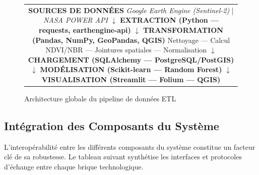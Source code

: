\documentclass[12pt,a4paper]{report}
\begin{document}
\begin{figure}[H]
\centering
\begin{tabular}{c}
\fbox{\parbox{0.82\textwidth}{
\centering
\vspace{0.4cm}
{\small\textbf{SOURCES DE DONNÉES}}\\[0.2cm]
\textit{Google Earth Engine (Sentinel-2)} \quad | \quad \textit{NASA POWER API}\\[0.3cm]
$\downarrow$\\[0.2cm]
{\small\textbf{EXTRACTION (Python --- requests, earthengine-api)}}\\[0.3cm]
$\downarrow$\\[0.2cm]
{\small\textbf{TRANSFORMATION (Pandas, NumPy, GeoPandas, QGIS)}}\\
{\scriptsize Nettoyage --- Calcul NDVI/NBR --- Jointures spatiales --- Normalisation}\\[0.3cm]
$\downarrow$\\[0.2cm]
{\small\textbf{CHARGEMENT (SQLAlchemy --- PostgreSQL/PostGIS)}}\\[0.3cm]
$\downarrow$\\[0.2cm]
{\small\textbf{MODÉLISATION (Scikit-learn --- Random Forest)}}\\[0.3cm]
$\downarrow$\\[0.2cm]
{\small\textbf{VISUALISATION (Streamlit --- Folium --- QGIS)}}\\[0.4cm]
}}
\end{tabular}
\caption{Architecture globale du pipeline de données ETL}
\label{fig:pipeline}
\end{figure}

\subsection{Intégration des Composants du Système}

L'interopérabilité entre les différents composants du système constitue un facteur clé de sa robustesse. Le tableau suivant synthétise les interfaces et protocoles d'échange entre chaque brique technologique.
\end{document}
